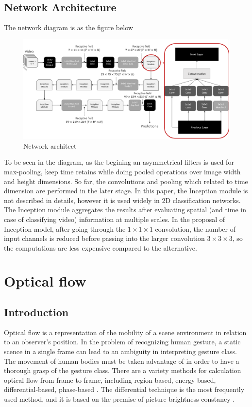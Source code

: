 \documentclass[a4paper, 12pt]{article}
\begin{document}
\subsection{Network Architecture}
The network diagram is as the figure below \cite{carreira2017quo}

\begin{figure}[H]
    \centering
    \includegraphics[width=\textwidth]{Stream architecture.png}
    \caption{Network architect \citep{carreira2017quo}}
    \label{Fig: network architech I3d}
\end{figure}

To be seen in the diagram, as the begining an asymmetrical filters is used for max-pooling, keep time retains while doing pooled operations over image width and height dimensions. So far, the convolutions and pooling which related to time dimension are performed in the later stage. In this paper, the Inception module is not described in details, however it is used widely in 2D classification networks. The Inception module aggregates the results after evaluating spatial (and time in case of classifying video) information at multiple scales. In the proposal of Inception model, after going through the $1 \times 1 \times 1$ convolution, the number of input channels is reduced before passing into the larger convolution $3 \times 3 \times 3$, so the computations are less expensive compared to the alternative.

\newpage

\section{Optical flow}
\subsection{Introduction}
Optical flow is a representation of the mobility of a scene environment in relation to an observer's position. In the problem of recognizing human gesture, a static scence in a single frame can lead to an ambiguity in interpreting gesture class.  The movement of human bodies must be taken advantage of in order to have a thorough grasp of the gesture class. There are a variety methods for calculation optical flow from frame to frame, including region-based, energy-based, differential-based, phase-based \citep{marco2018computer}. The differential technique is the most frequently used method, and it is based on the premise of picture brightness constancy \citep{horn1981determining}.
\end{document}
